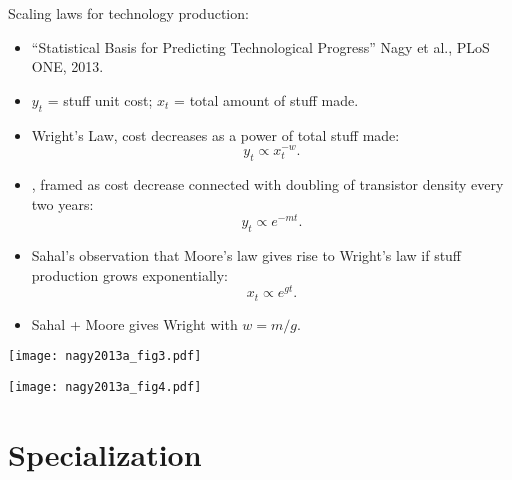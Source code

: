 \begin{frame}
  \small

  \begin{block}{Scaling laws for technology production:}
    \begin{itemize}
    \item<+->
      ``Statistical Basis for Predicting Technological Progress\cite{nagy2013a}''
      Nagy et al., PLoS ONE, 2013.
    \item<+->
      $y_t$ = stuff unit cost;
      $x_t$ = total amount of stuff made.
    \item<+->
      Wright's Law, cost decreases as a power of total stuff made:\cite{wright1936a}
      $$ 
      y_t \propto x_t^{-w}.
      $$
    \item<+-> 
      ,
      framed as cost decrease 
      connected with doubling of transistor density every two years:\cite{moore1965a}
      $$
      y_t \propto e^{- m t}. 
      $$
    \item<+-> 
      Sahal's observation that Moore's law gives rise to Wright's law if
      stuff production grows exponentially:\cite{sahal1979a}
      $$
      x_t \propto e^{g t}.
      $$
    \item<+-> 
      Sahal + Moore gives Wright with $w = m/g$.
    \end{itemize}
  \end{block}

\end{frame}

\begin{frame}

  \begin{block}{}
    \begin{center}
      \texttt{[image: nagy2013a\_fig3.pdf]}
    \end{center}
  \end{block}
  
\end{frame}

\begin{frame}[plain]

  \begin{block}{}
    \texttt{[image: nagy2013a\_fig4.pdf]}
  \end{block}
  
\end{frame}

\section{Specialization}

